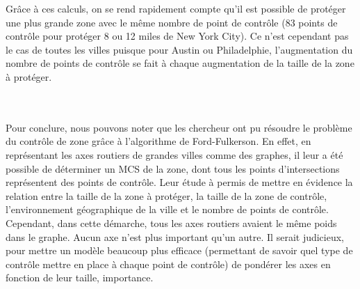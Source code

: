 Grâce à ces calculs, on se rend rapidement compte qu'il est possible de protéger une plus grande zone avec le même nombre de point de contrôle (83 points de contrôle pour protéger 8 ou 12 miles de New York City). Ce n'est cependant pas le cas de toutes les villes puisque pour Austin ou Philadelphie, l'augmentation du nombre de points de contrôle se fait à chaque augmentation de la taille de la zone à protéger.\\~\\~\\\par
Pour conclure, nous pouvons noter que les chercheur ont pu résoudre le problème du contrôle de zone grâce à l'algorithme de Ford-Fulkerson. En effet, en représentant les axes routiers de grandes villes comme des graphes, il leur a été possible de déterminer un MCS de la zone, dont tous les points d'intersections représentent des points de contrôle. Leur étude à permis de mettre en évidence la relation entre la taille de la zone à protéger, la taille de la zone de contrôle, l'environnement géographique de la ville et le nombre de points de contrôle.\\
Cependant, dans cette démarche, tous les axes routiers avaient le même poids dans le graphe. Aucun axe n'est plus important qu'un autre. Il serait judicieux, pour mettre un modèle beaucoup plus efficace (permettant de savoir quel type de contrôle mettre en place à chaque point de contrôle) de pondérer les axes en fonction de leur taille, importance.